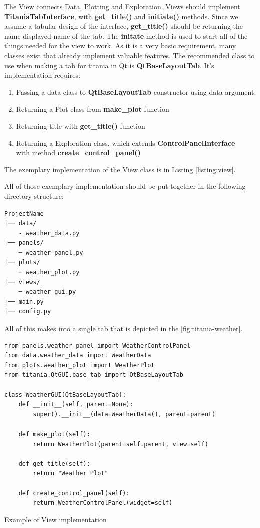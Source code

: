 The View connects Data, Plotting and Exploration. Views should implement \textbf{TitaniaTabInterface}, with \textbf{get\_title()} and \textbf{initiate()} methods.
Since we assume a tabular design of the interface, \textbf{get\_title()} should be returning the name displayed name of the tab.
The \textbf{initate} method is used to start all of the things needed for the view to work.
As it is a very basic requirement, many classes exist that already implement valuable features.
The recommended class to use when making a tab for titania in Qt is \textbf{QtBaseLayoutTab}.
It's implementation requires:
\begin{enumerate}
\item Passing a data class to \textbf{QtBaseLayoutTab} constructor using data argument.
\item Returning a Plot class from \textbf{make\_plot} function
\item Returning title with \textbf{get\_title()} function
\item Returning a Exploration class, which extends \textbf{ControlPanelInterface} \\ with method \textbf{create\_control\_panel()}
\end{enumerate}
The exemplary implementation of the View class is in Listing \ref{listing:view}.


All of those exemplary implementation should be put together in the following directory structure:

\begin{listing}[!ht]
\begin{verbatim}
ProjectName
|── data/
    - weather_data.py
|── panels/
    ─ weather_panel.py
|── plots/
    ─ weather_plot.py
|── views/
    ─ weather_gui.py
|── main.py
|── config.py
\end{verbatim}
\end{listing}

All of this makes into a single tab that is depicted in the \ref{fig:titania-weather}.

\begin{listing}[!ht]
\begin{verbatim}
from panels.weather_panel import WeatherControlPanel
from data.weather_data import WeatherData
from plots.weather_plot import WeatherPlot
from titania.QtGUI.base_tab import QtBaseLayoutTab

class WeatherGUI(QtBaseLayoutTab):
    def __init__(self, parent=None):
        super().__init__(data=WeatherData(), parent=parent)

    def make_plot(self):
        return WeatherPlot(parent=self.parent, view=self)

    def get_title(self):
        return "Weather Plot"

    def create_control_panel(self):
        return WeatherControlPanel(widget=self)

\end{verbatim}
\caption{Example of View implementation}
\label{listing:view}
\end{listing}

